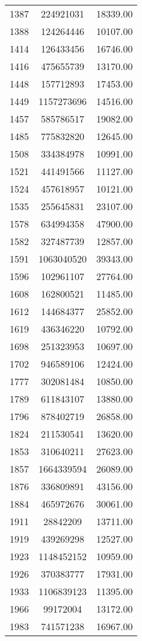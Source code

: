 \begin{centering}
\begin{supertabular}{|c|c|c|}
  1387 & 224921031 & 18339.00 \\ 
  1388 & 124264446 & 10107.00 \\ 
  1414 & 126433456 & 16746.00 \\ 
  1416 & 475655739 & 13170.00 \\ 
  1448 & 157712893 & 17453.00 \\ 
  1449 & 1157273696 & 14516.00 \\ 
  1457 & 585786517 & 19082.00 \\ 
  1485 & 775832820 & 12645.00 \\ 
  1508 & 334384978 & 10991.00 \\ 
  1521 & 441491566 & 11127.00 \\ 
  1524 & 457618957 & 10121.00 \\ 
  1535 & 255645831 & 23107.00 \\ 
  1578 & 634994358 & 47900.00 \\ 
  1582 & 327487739 & 12857.00 \\ 
  1591 & 1063040520 & 39343.00 \\ 
  1596 & 102961107 & 27764.00 \\ 
  1608 & 162800521 & 11485.00 \\ 
  1612 & 144684377 & 25852.00 \\ 
  1619 & 436346220 & 10792.00 \\ 
  1698 & 251323953 & 10697.00 \\ 
  1702 & 946589106 & 12424.00 \\ 
  1777 & 302081484 & 10850.00 \\ 
  1789 & 611843107 & 13880.00 \\ 
  1796 & 878402719 & 26858.00 \\ 
  1824 & 211530541 & 13620.00 \\ 
  1853 & 310640211 & 27623.00 \\ 
  1857 & 1664339594 & 26089.00 \\ 
  1876 & 336809891 & 43156.00 \\ 
  1884 & 465972676 & 30061.00 \\ 
  1911 & 28842209 & 13711.00 \\ 
  1919 & 439269298 & 12527.00 \\ 
  1923 & 1148452152 & 10959.00 \\ 
  1926 & 370383777 & 17931.00 \\ 
  1933 & 1106839123 & 11395.00 \\ 
  1966 & 99172004 & 13172.00 \\ 
  1983 & 741571238 & 16967.00 \\ 

\end{supertabular}
\end{centering}
